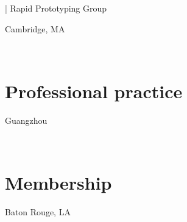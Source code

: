 \documentclass[]{baharmon_cv}
\renewcommand{\baselinestretch}{1.15}
\begin{document}
\begin{minipage}[t]{0.85\textwidth} 
\renewcommand{\baselinestretch}{1.75}
  | Rapid Prototyping Group
\end{minipage}
\begin{minipage}[t]{0.15\textwidth} 
Cambridge, MA
\end{minipage}\\

\sectiondivider


\section{Professional practice}
\begin{minipage}[t]{0.85\textwidth} 
\end{minipage}
\begin{minipage}[t]{0.15\textwidth} 
Guangzhou%
\end{minipage}\\
\clearpage



\section{Membership}
\begin{minipage}[t]{0.80\textwidth} 
\end{minipage}
\begin{minipage}[t]{0.20\textwidth} 
 Baton Rouge, LA
\end{minipage}
\\


\end{document}
